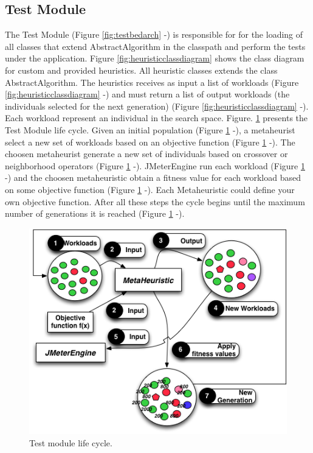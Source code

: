 \subsection{Test Module}

The Test Module (Figure \ref{fig:testbedarch}  -) is responsible for for the loading of all classes that extend AbstractAlgorithm in the classpath and perform the tests under the application. Figure \ref{fig:heuristicclassdiagram} shows the  class diagram for custom and provided heuristics. All heuristic classes extends the class AbstractAlgorithm. The heuristics receives  as input a  list of workloads (Figure \ref{fig:heuristicclassdiagram}  -) and must return a list of output workloads (the individuals selected for the next generation)  (Figure \ref{fig:heuristicclassdiagram}  -). Each workload represent an individual in the search space. Figure. \ref{fig:step2} presents the Test Module life cycle. Given an initial population (Figure \ref{fig:step2}  -),  a metaheurist select a new set of workloads based on an objective function (Figure \ref{fig:step2}  -). The choosen metaheurist generate a new set of individuals based on crossover or neighborhood operators (Figure \ref{fig:step2}  -).  JMeterEngine run each workload (Figure \ref{fig:step2}  -) and the choosen metaheuristic obtain a fitness value for each workload based on some objective function  (Figure \ref{fig:step2}  -). Each Metaheuristic could define your own objective function. After all these steps the cycle begins until the maximum number of generations it is reached (Figure \ref{fig:step2}  -). 

\begin{figure}[h]
\begin{minipage}{.5\textwidth}
\centering
\includegraphics[width=1\textwidth]{./images/step2.png}
\caption{Test module life cycle.}
\label{fig:step2}
\end{minipage}
\end{figure} 




